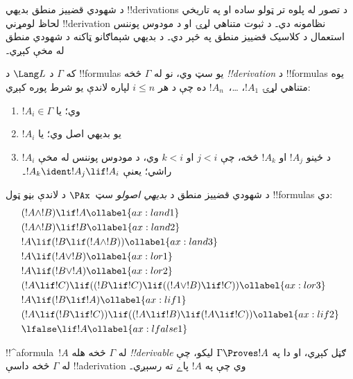 \documentclass[../../../include/open-logic-section]{subfiles}
\begin{document}


د شهودي قضييز منطق بديهي !!{derivation}s د تصور له پلوه تر ټولو ساده
او په تاريخي لحاظ لومړني !!{derivation} نظامونه دي۔ د ثبوت
متناهي لړۍ او د مودوس پوننس استعمال د کلاسيک قضييز منطق په
څېر دي۔ د بديهي شېماګانو ټاکنه د شهودي منطق له مخې کېږي۔

\begin{defn}[!!^{derivability}]
که $\Gamma$ د $\Lang L$ د !!{formula}s يو سټ وي، نو له
$\Gamma$ څخه \emph{!!{derivation}} د !!{formula}s يوه متناهي
لړۍ $!A_1$، \dots،~$!A_n$ ده چې د هر $i \le n$ لپاره لاندې
يو شرط پوره کېږي:
\begin{enumerate}
\item $!A_i \in \Gamma$ وي؛ يا
\item $!A_i$ يو بديهي اصل وي؛ يا
\item $!A_i$ د ځينو $!A_j$ او $!A_k$ څخه، چې $j < i$ او $k <
  i$ وي، د مودوس پوننس له مخې راشي؛ يعنې $!A_k \ident !A_j \lif !A_i$۔
\end{enumerate}
\end{defn}

\begin{defn}
د شهودي قضييز منطق د \emph{بديهي اصولو} سټ~$\PAx$ د لاندې
بڼو ټول !!{formula}s دي:
\begin{align}
  & (!A \land !B) \lif !A \ollabel{ax:land1}\\
  & (!A \land !B) \lif !B \ollabel{ax:land2}\\
  & !A \lif (!B \lif (!A \land !B)) \ollabel{ax:land3}\\
  & !A \lif (!A \lor !B) \ollabel{ax:lor1}\\
  & !A \lif (!B \lor !A) \ollabel{ax:lor2}\\
  & (!A \lif !C) \lif ((!B \lif !C) \lif ((!A \lor !B) \lif !C)) \ollabel{ax:lor3}\\
  & !A \lif (!B \lif !A) \ollabel{ax:lif1}\\
  & (!A \lif (!B \lif !C)) \lif ((!A \lif !B) \lif (!A \lif !C)) \ollabel{ax:lif2}\\
  & \lfalse \lif !A \ollabel{ax:lfalse1}
\end{align}
\end{defn}

\begin{defn}[!!^{derivability}]
!!^a{formula}~$!A$ له $\Gamma$ څخه هله \emph{!!{derivable}}
ګڼل کېږي، او دا په $\Gamma \Proves !A$ ليکو، چې له
$\Gamma$ څخه داسې !!a{derivation} وي چې په $!A$ پاے ته رسېږي۔
\end{defn}
\end{document}

